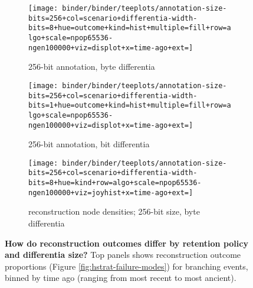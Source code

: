 \begin{figure*}
  \centering

\begin{minipage}{\textwidth}
\begin{subfigure}[b]{0.4\textwidth}
\centering
\texttt{[image: binder/binder/teeplots/annotation-size-bits=256+col=scenario+differentia-width-bits=8+hue=outcome+kind=hist+multiple=fill+row=algo+scale=npop65536-ngen100000+viz=displot+x=time-ago+ext=]}
\caption{256-bit annotation, byte differentia}
\end{subfigure}%
\begin{subfigure}[b]{0.6\textwidth}
\centering
\texttt{[image: binder/binder/teeplots/annotation-size-bits=256+col=scenario+differentia-width-bits=1+hue=outcome+kind=hist+multiple=fill+row=algo+scale=npop65536-ngen100000+viz=displot+x=time-ago+ext=]}
\caption{256-bit annotation, bit differentia}
\end{subfigure}
\end{minipage}
  \begin{subfigure}[b]{\textwidth}
    \centering
    \texttt{[image: binder/binder/teeplots/annotation-size-bits=256+col=scenario+differentia-width-bits=8+hue=kind+row=algo+scale=npop65536-ngen100000+viz=joyhist+x=time-ago+ext=]}
    \caption{reconstruction node densities; 256-bit size, byte differentia}
  \end{subfigure}%
  \caption{%
  \textbf{How do reconstruction outcomes differ by retention policy and differentia size?}
  Top panels shows reconstruction outcome proportions (Figure \ref{fig:hstrat-failure-modes}) for branching events, binned by time ago (ranging from most recent to most ancient).
}
\end{figure*}
